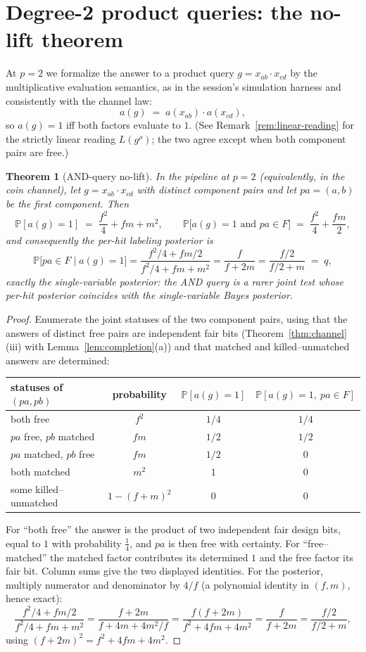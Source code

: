 \documentclass[11pt]{article}
\newtheorem{theorem}{Theorem}[section]
\theoremstyle{definition}
\theoremstyle{remark}
\newcommand{\Prob}{\mathbb{P}}
\begin{document}
\section{Degree-2 product queries: the no-lift theorem}\label{sec:and}

At $p=2$ we formalize the answer to a product query
$g=x_{ab}\cdot x_{cd}$ by the multiplicative evaluation semantics, as in
the session's simulation harness and consistently with the channel law:
\[
a(g)\;=\;a(x_{ab})\cdot a(x_{cd}),
\]
so $a(g)=1$ iff both factors evaluate to $1$.  (See
Remark~\ref{rem:linear-reading} for the strictly linear reading
$L(g^\rho)$; the two agree except when both component pairs are free.)

\begin{theorem}[AND-query no-lift]\label{thm:and}
In the pipeline at $p=2$ (equivalently, in the coin channel), let
$g=x_{ab}\cdot x_{cd}$ with distinct component pairs and let
$pa=(a,b)$ be the first component.  Then
\[
\Prob[a(g)=1]\;=\;\frac{f^2}{4}+fm+m^2,
\qquad
\Prob\bigl[a(g)=1 \text{ and } pa\in F\bigr]\;=\;\frac{f^2}{4}+\frac{fm}{2},
\]
and consequently the per-hit labeling posterior is
\[
\Prob\bigl[pa\in F\mid a(g)=1\bigr]
=\frac{f^2/4+fm/2}{f^2/4+fm+m^2}
=\frac{f}{f+2m}
=\frac{f/2}{f/2+m}
\;=\;q ,
\]
exactly the single-variable posterior: the AND query is a rarer joint
test whose per-hit posterior coincides with the single-variable Bayes
posterior.
\end{theorem}

\begin{proof}
Enumerate the joint statuses of the two component pairs, using that the
answers of distinct free pairs are independent fair bits
(Theorem~\ref{thm:channel}(iii) with Lemma~\ref{lem:completion}(a)) and
that matched and killed--unmatched answers are determined:
\begin{center}
\begin{tabular}{lccc}
\hline
statuses of $(pa,pb)$ & probability & $\Prob[a(g)=1]$
 & $\Prob[a(g)=1,\ pa\in F]$\\
\hline
both free & $f^2$ & $1/4$ & $1/4$\\
$pa$ free, $pb$ matched & $fm$ & $1/2$ & $1/2$\\
$pa$ matched, $pb$ free & $fm$ & $1/2$ & $0$\\
both matched & $m^2$ & $1$ & $0$\\
some killed--unmatched & $1-(f+m)^2$ & $0$ & $0$\\
\hline
\end{tabular}
\end{center}
For ``both free'' the answer is the product of two independent fair
design bits, equal to $1$ with probability $\frac14$, and $pa$ is then
free with certainty.  For ``free--matched'' the matched factor
contributes its determined $1$ and the free factor its fair bit.  Column
sums give the two displayed identities.  For the posterior, multiply
numerator and denominator by $4/f$ (a polynomial identity in $(f,m)$,
hence exact):
\[
\frac{f^2/4+fm/2}{f^2/4+fm+m^2}
=\frac{f+2m}{f+4m+4m^2/f}
=\frac{f(f+2m)}{f^2+4fm+4m^2}
=\frac{f}{f+2m}
=\frac{f/2}{f/2+m},
\]
using $(f+2m)^2=f^2+4fm+4m^2$.
\end{proof}
\end{document}
